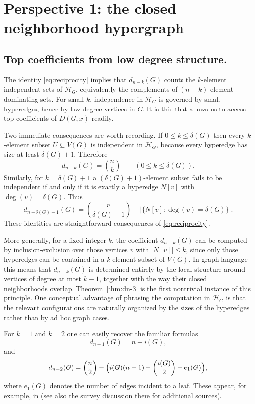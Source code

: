 \documentclass[11pt]{amsart}
\numberwithin{equation}{section}
\newcommand{\VV}{V(G)}
\newcommand{\HH}{\mathcal{H}}
\begin{document}
\section{Perspective 1: the closed neighborhood hypergraph}

\subsection{Top coefficients from low degree structure.}

The identity \eqref{eq:reciprocity} implies that $d_{n-k}(G)$ counts the $k$-element independent sets of $\HH_G$, equivalently the complements of $(n-k)$-element dominating sets. For small $k$, independence in $\HH_G$ is governed by small hyperedges, hence by low degree vertices in $G$. It is this that allows us to access top coefficients of $D(G,x)$ readily.

Two immediate consequences are worth recording. If $0\le k\le \delta(G)$ then every $k$-element subset $U\subseteq\VV$ is independent in $\HH_G$, because every hyperedge has size at least $\delta(G)+1$. Therefore
\begin{equation}\label{eq:topkBinomial}
d_{n-k}(G)=\binom{n}{k}\qquad (0\le k\le \delta(G)).
\end{equation}
Similarly, for $k=\delta(G)+1$ a $(\delta(G)+1)$-element subset fails to be independent if and only if it is exactly a hyperedge $N[v]$ with $\deg(v)=\delta(G)$. Thus
\begin{equation}\label{eq:topDeltaPlusOne}
d_{n-\delta(G)-1}(G)=\binom{n}{\delta(G)+1}-\bigl|\{N[v]:\deg(v)=\delta(G)\}\bigr|.
\end{equation}
These identities are straightforward consequences of \eqref{eq:reciprocity}.

More generally, for a fixed integer $k$, the coefficient $d_{n-k}(G)$ can be computed by inclusion-exclusion over those vertices $v$ with $|N[v]|\le k$, since only those hyperedges can be contained in a $k$-element subset of $\VV$. In graph language this means that $d_{n-k}(G)$ is determined entirely by the local structure around vertices of degree at most $k-1$, together with the way their closed neighborhoods overlap. Theorem~\ref{thm:dn-3} is the first nontrivial instance of this principle. One conceptual advantage of phrasing the computation in $\HH_G$ is that the relevant configurations are naturally organized by the sizes of the hyperedges rather than by ad hoc graph cases.

For $k=1$ and $k=2$ one can easily recover the familiar formulas
\begin{equation}\label{eq:dn-1}
d_{n-1}(G)=n-i(G),
\end{equation}
and
\begin{equation}\label{eq:dn-2}
d_{n-2}(G)=\binom{n}{2}-\Bigl(i(G)(n-1)-\binom{i(G)}{2}-e_1(G)\Bigr),
\end{equation}
where $e_1(G)$ denotes the number of edges incident to a leaf. These appear, for example, in \cite{BeatonPaths2019} (see also the survey discussion there for additional sources).
\end{document}
